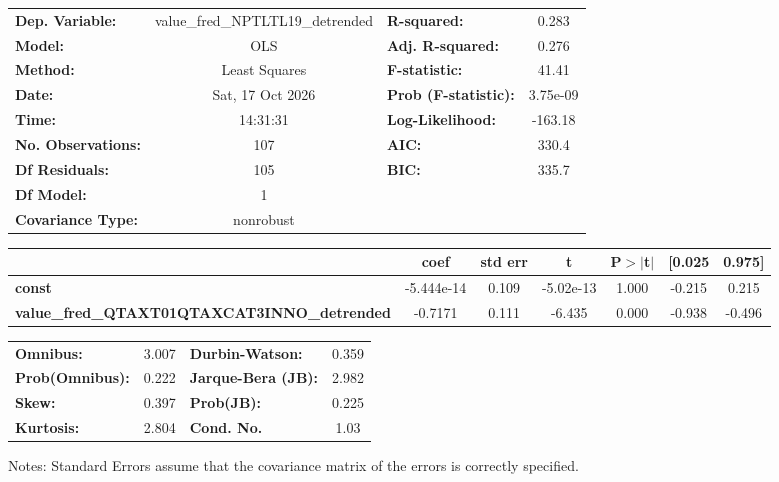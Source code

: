 \begin{center}
\begin{tabular}{lclc}
\toprule
\textbf{Dep. Variable:}                              & value\_fred\_NPTLTL19\_detrended & \textbf{  R-squared:         } &     0.283   \\
\textbf{Model:}                                      &               OLS                & \textbf{  Adj. R-squared:    } &     0.276   \\
\textbf{Method:}                                     &          Least Squares           & \textbf{  F-statistic:       } &     41.41   \\
\textbf{Date:}                                       &         Sat, 17 Oct 2026         & \textbf{  Prob (F-statistic):} &  3.75e-09   \\
\textbf{Time:}                                       &             14:31:31             & \textbf{  Log-Likelihood:    } &   -163.18   \\
\textbf{No. Observations:}                           &                 107              & \textbf{  AIC:               } &     330.4   \\
\textbf{Df Residuals:}                               &                 105              & \textbf{  BIC:               } &     335.7   \\
\textbf{Df Model:}                                   &                   1              & \textbf{                     } &             \\
\textbf{Covariance Type:}                            &            nonrobust             & \textbf{                     } &             \\
\bottomrule
\end{tabular}
\begin{tabular}{lcccccc}
                                                     & \textbf{coef} & \textbf{std err} & \textbf{t} & \textbf{P$> |$t$|$} & \textbf{[0.025} & \textbf{0.975]}  \\
\midrule
\textbf{const}                                       &   -5.444e-14  &        0.109     & -5.02e-13  &         1.000        &       -0.215    &        0.215     \\
\textbf{value\_fred\_QTAXT01QTAXCAT3INNO\_detrended} &      -0.7171  &        0.111     &    -6.435  &         0.000        &       -0.938    &       -0.496     \\
\bottomrule
\end{tabular}
\begin{tabular}{lclc}
\textbf{Omnibus:}       &  3.007 & \textbf{  Durbin-Watson:     } &    0.359  \\
\textbf{Prob(Omnibus):} &  0.222 & \textbf{  Jarque-Bera (JB):  } &    2.982  \\
\textbf{Skew:}          &  0.397 & \textbf{  Prob(JB):          } &    0.225  \\
\textbf{Kurtosis:}      &  2.804 & \textbf{  Cond. No.          } &     1.03  \\
\bottomrule
\end{tabular}
\end{center}

Notes: \newline
 [1] Standard Errors assume that the covariance matrix of the errors is correctly specified.